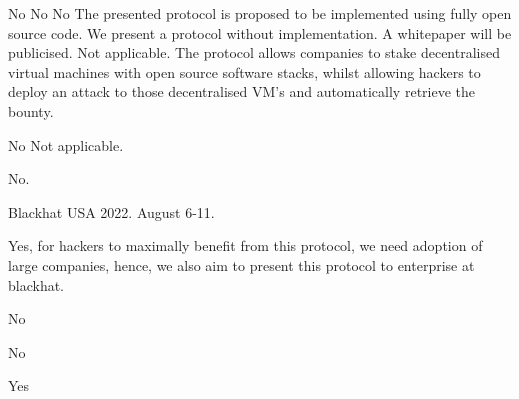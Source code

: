 \documentclass{article}
\begin{document}
No
No
No
The presented protocol is proposed to be implemented using fully open source code.
We present a protocol without implementation.
A whitepaper will be publicised.
Not applicable.
The protocol allows companies to stake decentralised virtual machines with open source software stacks, whilst allowing hackers to deploy an attack to those decentralised VM's and automatically retrieve the bounty.

No
Not applicable.

No.

Blackhat USA 2022. August 6-11.

Yes, for hackers to maximally benefit from this protocol, we need adoption of large companies, hence, we also aim to present this protocol to enterprise at blackhat.

No

No

Yes
\end{document}
